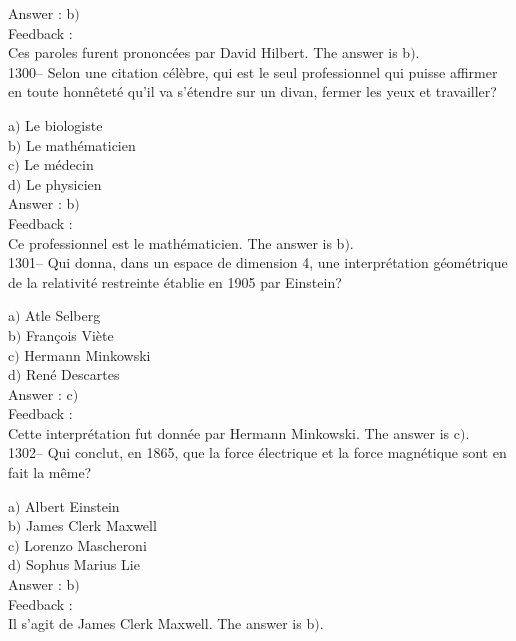 \documentclass[letterpaper, 12pt]{article}
\begin{document}
Answer : b$)$\\

Feedback : \\
Ces paroles furent prononc\'ees par David Hilbert.
The answer is  b$)$.\\

1300-- Selon une citation c\'el\`ebre, qui est le seul professionnel
qui puisse affirmer en toute honn\^etet\'e qu'il va s'\'etendre sur
un divan, fermer les yeux et travailler?

a$)$ Le biologiste \\
b$)$ Le math\'ematicien \\
c$)$ Le m\'edecin \\
d$)$ Le physicien\\

Answer : b$)$\\

Feedback : \\
Ce professionnel est le math\'ematicien.
The answer is  b$)$.\\

1301-- Qui donna, dans un espace de dimension 4, une
interpr\'etation g\'eom\'etrique de la relativit\'e restreinte
\'etablie en 1905 par Einstein?

a$)$ Atle Selberg \\
b$)$ Fran\c cois Vi\`ete \\
c$)$ Hermann Minkowski \\
d$)$ Ren\'e Descartes\\

Answer : c$)$\\

Feedback : \\
Cette interpr\'etation fut donn\'ee par Hermann Minkowski.
The answer is  c$)$.\\

1302-- Qui conclut, en 1865, que la force \'electrique et la force
magn\'etique sont en fait la m\^eme?

a$)$ Albert Einstein \\
b$)$ James Clerk Maxwell \\
c$)$ Lorenzo Mascheroni\\
d$)$ Sophus Marius Lie\\

Answer : b$)$\\

Feedback : \\
Il s'agit de James Clerk Maxwell.
The answer is  b$)$.\\
\end{document}
